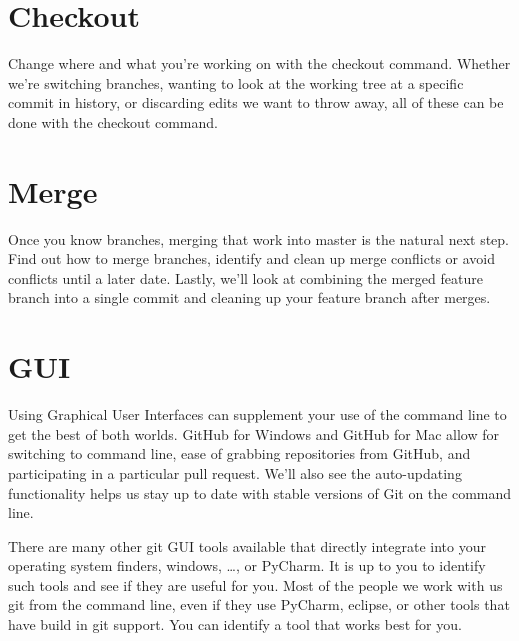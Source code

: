 
\section{Checkout}\label{checkout}

Change where and what you're working on with the checkout command.
Whether we're switching branches, wanting to look at the working tree at
a specific commit in history, or discarding edits we want to throw away,
all of these can be done with the checkout command.



\section{Merge}\label{merge}

Once you know branches, merging that work into master is the natural
next step. Find out how to merge branches, identify and clean up merge
conflicts or avoid conflicts until a later date. Lastly, we'll look at
combining the merged feature branch into a single commit and cleaning up
your feature branch after merges.


\section{GUI}\label{gui}

Using Graphical User Interfaces can supplement your use of the command
line to get the best of both worlds. GitHub for Windows and GitHub for
Mac allow for switching to command line, ease of grabbing repositories
from GitHub, and participating in a particular pull request. We'll also
see the auto-updating functionality helps us stay up to date with stable
versions of Git on the command line.


There are many other git GUI tools available that directly integrate into your
operating system finders, windows, \ldots{}, or PyCharm. It is up to you
to identify such tools and see if they are useful for you. Most of the
people we work with us git from the command line, even if they use
PyCharm, eclipse, or other tools that have build in git support. You can
identify a tool that works best for you.

